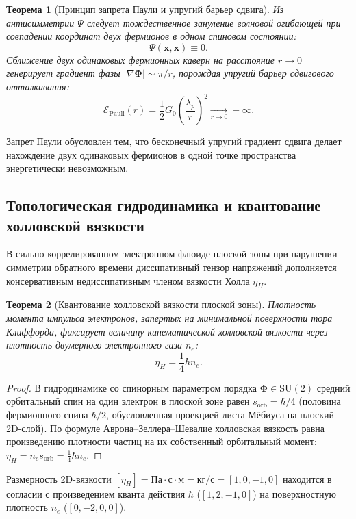 \documentclass[11pt,a4paper]{article}
\newtheorem{theorem}{Теорема}
\theoremstyle{definition}
\theoremstyle{remark}
\begin{document}
\begin{theorem}[Принцип запрета Паули и упругий барьер сдвига]
\label{thm:pauli_exclusion_repulsion}
Из антисимметрии $\Psi$ следует тождественное зануление волновой огибающей при совпадении координат двух фермионов в одном спиновом состоянии:
\begin{equation}
	\Psi(\mathbf{x}, \mathbf{x}) \equiv 0.
\label{eq:pauli_zero_amplitude}
\end{equation}
Сближение двух одинаковых фермионных каверн на расстояние $r \to 0$ генерирует градиент фазы $|\nabla\boldsymbol{\Phi}| \sim \pi / r$, порождая упругий барьер сдвигового отталкивания:
\begin{equation}
	\mathcal{E}_{\mathrm{Pauli}}(r) = \frac{1}{2} G_0 \left(\frac{\lambda_p}{r}\right)^2 \xrightarrow[r \to 0]{} +\infty.
\label{eq:pauli_repulsion_energy}
\end{equation}
\end{theorem}
Запрет Паули обусловлен тем, что бесконечный упругий градиент сдвига делает нахождение двух одинаковых фермионов в одной точке пространства энергетически невозможным.

\subsection{Топологическая гидродинамика и квантование холловской вязкости}

В сильно коррелированном электронном флюиде плоской зоны при нарушении симметрии обратного времени диссипативный тензор напряжений дополняется консервативным недиссипативным членом вязкости Холла $\eta_H$.

\begin{theorem}[Квантование холловской вязкости плоской зоны]
\label{thm:hall_viscosity_quantization}
    Плотность момента импульса электронов, запертых на минимальной поверхности тора Клиффорда, фиксирует величину кинематической холловской вязкости через плотность двумерного электронного газа $n_e$:
\begin{equation}
    \eta_H = \frac{1}{4} \hbar n_e.
    \label{eq:hall_viscosity_exact}
\end{equation}
\end{theorem}
\begin{proof}
В гидродинамике со спинорным параметром порядка $\boldsymbol{\Phi} \in \mathrm{SU}(2)$ средний орбитальный спин на один электрон в плоской зоне равен $s_{\mathrm{orb}} = \hbar / 4$ (половина фермионного спина $\hbar/2$, обусловленная проекцией листа Мёбиуса на плоский 2D-слой). По формуле Аврона--Зеллера--Шевалие холловская вязкость равна произведению плотности частиц на их собственный орбитальный момент: $\eta_H = n_e s_{\mathrm{orb}} = \frac{1}{4} \hbar n_e$.
\end{proof}
Размерность 2D-вязкости $[\eta_H] = \text{Па}\cdot\text{с}\cdot\text{м} = \text{кг/с} = [1, 0, -1, 0]$ находится в согласии с произведением кванта действия $\hbar$ ($[1, 2, -1, 0]$) на поверхностную плотность $n_e$ ($[0, -2, 0, 0]$).
\end{document}
